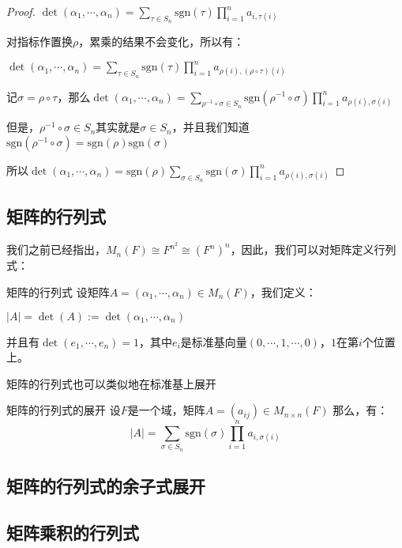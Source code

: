 \documentclass[12pt, a4paper, oneside, UTF8]{ctexbook}
\begin{document}
			\begin{proof}
				$\det(\alpha_1,\cdots,\alpha_n)=\sum_{\tau  \in S_n} \text{sgn}(\tau ) \prod_{i=1}^n a_{i,\tau (i)}$

				对指标作置换$\rho $，累乘的结果不会变化，所以有：

				$\det(\alpha_1,\cdots,\alpha_n)=\sum_{\tau \in S_n} \text{sgn}(\tau ) \prod_{i=1}^n a_{\rho(i),(\rho \circ \tau )(i)}$

				记$\sigma =\rho \circ \tau $，那么$\det(\alpha_1,\cdots,\alpha_n)=\sum_{\rho^{-1} \circ \sigma  \in S_n} \text{sgn}(\rho^{-1} \circ \sigma) \prod_{i=1}^n a_{\rho(i),\sigma (i)}$

				但是，$\rho^{-1} \circ \sigma \in S_n$其实就是$\sigma \in S_n$，并且我们知道$\text{sgn}(\rho^{-1} \circ \sigma)=\text{sgn}(\rho )\text{sgn}(\sigma )$

				所以$\det(\alpha_1,\cdots,\alpha_n)=\text{sgn}(\rho )\sum_{\sigma \in S_n} \text{sgn}(\sigma) \prod_{i=1}^n a_{\rho(i),\sigma(i)}$
			\end{proof}
		\subsection{矩阵的行列式}
			我们之前已经指出，$M_n (F) \cong F^{n^2} \cong (F^n)^n$，因此，我们可以对矩阵定义行列式：
			\begin{defn}{矩阵的行列式}{}
				设矩阵$A = (\alpha_1,\cdots,\alpha_n)\in M_n (F)$，我们定义：

				$|A|=\det (A) := \det(\alpha_1,\cdots,\alpha_n)$

				并且有$\det(e_1,\cdots,e_n)=1$，其中$e_i$是标准基向量$(0,\cdots,1,\cdots,0)$，$1$在第$i$个位置上。
			\end{defn}
			矩阵的行列式也可以类似地在标准基上展开
			\begin{them}{矩阵的行列式的展开}{}
				设$F$是一个域，矩阵$A=(a_{ij}) \in M_{n\times n}(F)$
				那么，有：
				\begin{equation}
					|A|=\sum_{\sigma \in S_n} \text{sgn}(\sigma) \prod_{i=1}^n a_{i,\sigma(i)}
				\end{equation}
			\end{them}
		\subsection{矩阵的行列式的余子式展开}
		\subsection{矩阵乘积的行列式}
\ifx\allfiles\undefined
\end{document}
